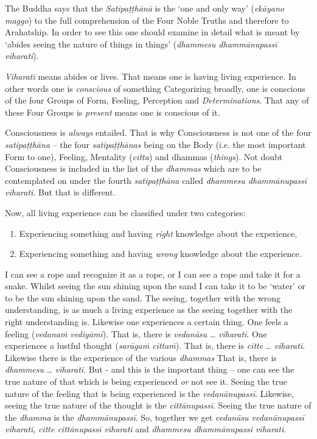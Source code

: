The Buddha says that the \textit{Satipaṭṭhānā} is the `one and only way' (\textit{ekāyano maggo}) to the full comprehension of the Four Noble Truths and therefore to Arahatship. In order to see this one should examine in detail what is meant by `abides seeing the nature of things in things' (\textit{dhammesu dhammānupassī viharati}).

\textit{Viharati} means abides or lives. That means one is having living experience. In other words one is \emph{conscious} of something Categorizing broadly, one is conscious of the four Groups of Form, Feeling, Perception and \textit{Determinations}. That any of these Four Groups is \emph{present} means one is conscious of it.

Consciousness is \emph{always} entailed. That is why Consciousness is not one of the four \textit{satipaṭṭhāna} -- the four \textit{satipaṭṭhānas} being on the Body (i.e. the most important Form to one), Feeling, Mentality (\textit{citta}) and dhammas (\textit{things}). Not doubt Consciousness is included in the list of the \emph{dhammas} which are to be contemplated on under the fourth \textit{satipaṭṭhāna} called \textit{dhammesu dhammānupassī viharati}. But that is different.

Now, all living experience can be classified under two categories:

\begin{enumerate}
\def\labelenumi{\arabic{enumi}.}
\item
  Experiencing something and having \emph{right} knowledge about the experience,
\item
  Experiencing something and having \emph{wrong} knowledge about the experience.
\end{enumerate}

I can see a rope and recognize it as a rope, or I can see a rope and take it for a snake. Whilst seeing the sun shining upon the sand I can take it to be `water' or to be the sun shining upon the sand. The seeing, together with the wrong understanding, is as much a living experience as the seeing together with the right understanding is. Likewise one experiences a certain thing. One feels a feeling (\textit{vedanaṁ vediyāmī}). That is, there is \textit{vedanāsu} \ldots\hspace{0pt} \textit{viharati}. One experiences a lustful thought (\textit{sarāgaṁ cittaṁ}). That is, there is \textit{citte} \ldots\hspace{0pt} \textit{viharati}. Likewise there is the experience of the various \textit{dhammas} That is, there is \textit{dhammesu} \ldots\hspace{0pt} \textit{viharati}. But - and this is the important thing -- one can see the true nature of that which is being experienced \emph{or} not see it. Seeing the true nature of the feeling that is being experienced is the \textit{vedanānupassī}. Likewise, seeing the true nature of the thought is the \textit{cittānupassī}. Seeing the true nature of the \textit{dhamma} is the \textit{dhammānupassī}. So, together we get \textit{vedanāsu vedanānupassī viharati}, \textit{citte cittānupassī viharati} and \textit{dhammesu dhammānupassi viharati}.

